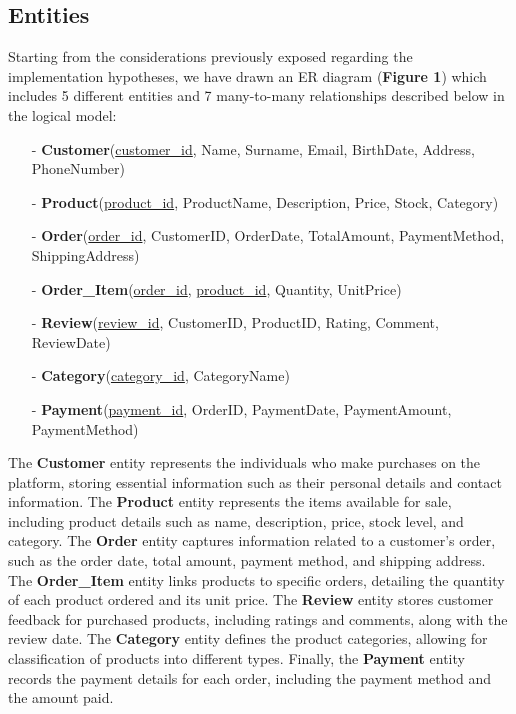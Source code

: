\documentclass[a4paper,12pt]{article}
\begin{document}
  \subsection{Entities}
  \par Starting from the considerations previously exposed regarding the implementation hypotheses, we have drawn an ER diagram (\textbf{Figure 1}) which includes 5 different entities and 7 many-to-many relationships described below in the logical model: \par
    \begin{itemize}[noitemsep]
    \item[-]	\textbf{Customer}(\underline{customer\_id}, Name, Surname, Email, BirthDate, Address, PhoneNumber)
    \item[-]	\textbf{Product}(\underline{product\_id}, ProductName, Description, Price, Stock, Category)
    \item[-]	\textbf{Order}(\underline{order\_id}, CustomerID, OrderDate, TotalAmount, PaymentMethod, ShippingAddress)
    \item[-]	\textbf{Order\_Item}(\underline{order\_id}, \underline{product\_id}, Quantity, UnitPrice)
    \item[-]	\textbf{Review}(\underline{review\_id}, CustomerID, ProductID, Rating, Comment, ReviewDate)
    \item[-]	\textbf{Category}(\underline{category\_id}, CategoryName)
    \item[-]	\textbf{Payment}(\underline{payment\_id}, OrderID, PaymentDate, PaymentAmount, PaymentMethod)
    \end{itemize} \par
  The \textbf{Customer} entity represents the individuals who make purchases on the platform, storing essential information such as their personal details and contact information. 
  The \textbf{Product} entity represents the items available for sale, including product details such as name, description, price, stock level, and category. 
  The \textbf{Order} entity captures information related to a customer’s order, such as the order date, total amount, payment method, and shipping address.
  The \textbf{Order\_Item} entity links products to specific orders, detailing the quantity of each product ordered and its unit price.
  The \textbf{Review} entity stores customer feedback for purchased products, including ratings and comments, along with the review date.
  The \textbf{Category} entity defines the product categories, allowing for classification of products into different types.
  Finally, the \textbf{Payment} entity records the payment details for each order, including the payment method and the amount paid.
  
\end{document}
